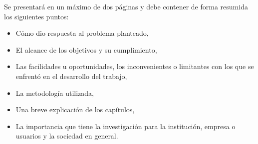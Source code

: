 %
Se presentará en un máximo de dos páginas y debe contener de forma resumida los siguientes puntos:

\begin{itemize}
	\item Cómo dio respuesta al problema planteado,
	\item El alcance de los objetivos y su cumplimiento,
	\item Las facilidades u oportunidades, los inconvenientes o limitantes con los que se enfrentó en el desarrollo del trabajo,
	\item La metodología utilizada, 
	\item Una breve explicación de los capítulos,
	\item La importancia que tiene la investigación para la institución, empresa o usuarios y la sociedad en general.
\end{itemize}



